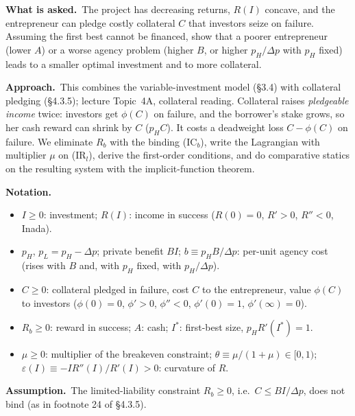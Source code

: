 \documentclass[11pt,a4paper]{article}
\newcommand{\notation}{\par\noindent\textbf{Notation.}}
\newcommand{\assume}{\par\smallskip\noindent\textbf{Assumption.}~}
\newcommand{\asked}{\par\medskip\noindent\textbf{What is asked.}~}
\newcommand{\approach}{\par\smallskip\noindent\textbf{Approach.}~}
\begin{document}
\asked The project has decreasing returns, $R(I)$ concave, and the entrepreneur can pledge costly
collateral $C$ that investors seize on failure. Assuming the first best cannot be financed, show
that a poorer entrepreneur (lower $A$) or a worse agency problem (higher $B$, or higher $p_H/\Delta p$
with $p_H$ fixed) leads to a smaller optimal investment and to more collateral.

\approach This combines the variable-investment model (\S3.4) with collateral pledging (\S4.3.5);
lecture Topic~4A, collateral reading. Collateral raises \emph{pledgeable income} twice: investors get
$\phi(C)$ on failure, and the borrower's stake grows, so her cash reward can shrink by $C$ ($p_HC$).
It costs a deadweight loss $C-\phi(C)$ on failure. We eliminate $R_b$ with the binding (IC$_b$),
write the Lagrangian with multiplier $\mu$ on (IR$_l$), derive the first-order conditions, and do
comparative statics on the resulting system with the implicit-function theorem.

\notation
\begin{itemize}
  \item $I\ge0$: investment; $R(I)$: income in success ($R(0)=0$, $R'>0$, $R''<0$, Inada).
  \item $p_H$, $p_L=p_H-\Delta p$; private benefit $BI$; $b\equiv p_HB/\Delta p$: per-unit agency cost
        (rises with $B$ and, with $p_H$ fixed, with $p_H/\Delta p$).
  \item $C\ge0$: collateral pledged in failure, cost $C$ to the entrepreneur, value $\phi(C)$ to
        investors ($\phi(0)=0$, $\phi'>0$, $\phi''<0$, $\phi'(0)=1$, $\phi'(\infty)=0$).
  \item $R_b\ge0$: reward in success; $A$: cash; $I^*$: first-best size, $p_HR'(I^*)=1$.
  \item $\mu\ge0$: multiplier of the breakeven constraint; $\theta\equiv\mu/(1+\mu)\in[0,1)$;
        $\varepsilon(I)\equiv -IR''(I)/R'(I)>0$: curvature of $R$.
\end{itemize}
\assume The limited-liability constraint $R_b\ge0$, i.e.\ $C\le BI/\Delta p$, does not bind (as in
footnote 24 of \S4.3.5).
\end{document}
